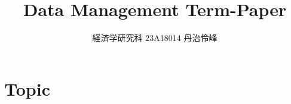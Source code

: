 \documentclass{jsarticle}
\begin{document}
\title{Data Management Term-Paper}
\author{経済学研究科 23A18014 丹治伶峰}
\date{}
\maketitle

\section{Topic}
\end{document}
